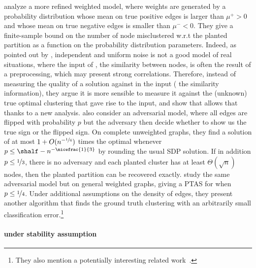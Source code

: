 \Textcite{Joachims2005} analyze a more refined weighted model, where weights are generated by a
probability distribution whose mean on true positive edges is larger than $\mu^+>0$ and whose mean
on true negative edges is smaller than $\mu^-<0$. They give a finite-sample bound on the number of
node misclustered w.r.t the planted partition as a function on the probability distribution
parameters. Indeed, as pointed out by \textcite{plantedAilon09}, independent and uniform noise is
not a good model of real situations, where the input of \pcc{}, \ie{} the similarity between nodes,
is often the result of a preprocessing, which may present strong correlations. Therefore, instead of
measuring the quality of a solution against in the input (\ie{} the similarity information), they
argue it is more sensible to measure it against the (unknown) true optimal clustering that gave rise
to the input, and show that \ccpivot{} allows that thanks to a new analysis. \Textcite{Mathieu2010}
also consider an adversarial model, where all edges are flipped with probability $p$ but the
adversary then decide whether to show us the true sign or the flipped sign. On complete unweighted
graphs, they find a solution of \mind{} at most $1 + O(n^{-\nicefrac{1}{6}})$ times the optimal
whenever $p \leq \shalf - n^{-\nicefrac{1}{3}}$ by rounding the usual SDP solution. If in addition
$p\leq\nicefrac{1}{3}$, there is no adversary and each planted cluster has at least
$\Theta(\sqrt{n})$ nodes, then the planted partition can be recovered exactly.
\Textcite{Makarychev2014} study the same adversarial model but on general weighted graphs, giving a PTAS
for \mind{} when $p\leq \nicefrac{1}{4}$. Under additional assumptions on the density of edges, they
present another algorithm that finds the ground truth clustering with an arbitrarily small
classification error.\footnote{They also mention a potentially interesting related
work~\autocite{unobservedCC14}.} %

\paragraph{\pcc{} under stability assumption}

